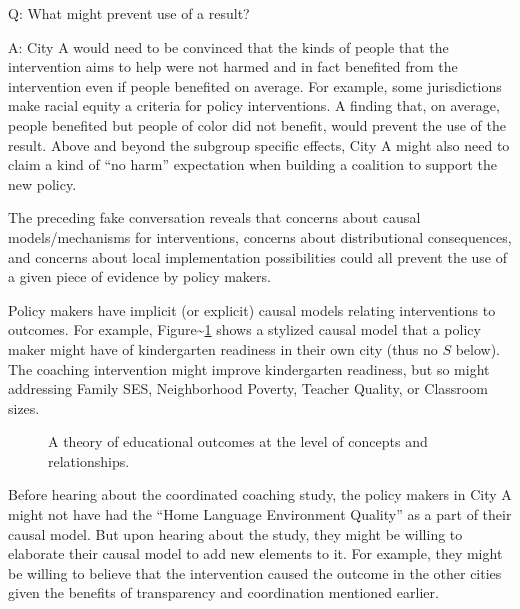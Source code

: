 \documentclass[
  11pt,
]{article}
\begin{document}
Q: What might prevent use of a result?

A: City A would need to be convinced that the kinds of people that the
intervention aims to help were not harmed and in fact benefited from the
intervention even if people benefited on average. For example, some
jurisdictions make racial equity a criteria for policy interventions. A
finding that, on average, people benefited but people of color did not
benefit, would prevent the use of the result. Above and beyond the
subgroup specific effects, City A might also need to claim a kind of
``no harm'' expectation when building a coalition to support the new
policy.

The preceding fake conversation reveals that concerns about causal
models/mechanisms for interventions, concerns about distributional
consequences, and concerns about local implementation possibilities
could all prevent the use of a given piece of evidence by policy makers.

Policy makers have implicit (or explicit) causal models relating
interventions to outcomes. For example,
Figure\textasciitilde{}\ref{fig:theory2} shows a stylized causal model
that a policy maker might have of kindergarten readiness in their own
city (thus no \(\boxed{S}\) below). The coaching intervention might
improve kindergarten readiness, but so might addressing Family SES,
Neighborhood Poverty, Teacher Quality, or Classroom sizes.

\begin{figure}[H]
\centering
{}
\caption{A theory of educational outcomes at the level of concepts and
relationships.}\label{fig:theory2}
\end{figure}

Before hearing about the coordinated coaching study, the policy makers
in City A might not have had the ``Home Language Environment Quality''
as a part of their causal model. But upon hearing about the study, they
might be willing to elaborate their causal model to add new elements to
it. For example, they might be willing to believe that the intervention
caused the outcome in the other cities given the benefits of
transparency and coordination mentioned earlier.
\end{document}
